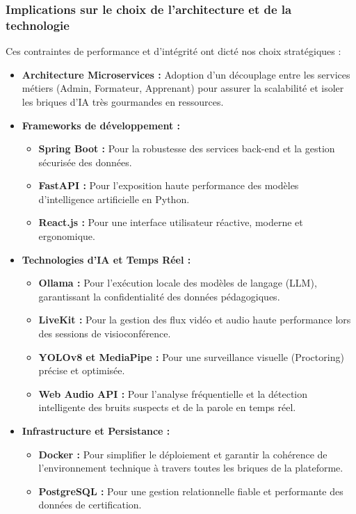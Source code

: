 \subsubsection{Implications sur le choix de l’architecture et de la technologie}
Ces contraintes de performance et d'intégrité ont dicté nos choix stratégiques :
\begin{itemize}
    \item \textbf{Architecture Microservices :} Adoption d'un découplage entre les services métiers (Admin, Formateur, Apprenant) pour assurer la scalabilité et isoler les briques d'IA très gourmandes en ressources.
    \item \textbf{Frameworks de développement :} 
    \begin{itemize}
        \item \textbf{Spring Boot :} Pour la robustesse des services back-end et la gestion sécurisée des données.
        \item \textbf{FastAPI :} Pour l'exposition haute performance des modèles d'intelligence artificielle en Python.
        \item \textbf{React.js :} Pour une interface utilisateur réactive, moderne et ergonomique.
    \end{itemize}
    \item \textbf{Technologies d'IA et Temps Réel :}
    \begin{itemize}
        \item \textbf{Ollama :} Pour l'exécution locale des modèles de langage (LLM), garantissant la confidentialité des données pédagogiques.
        \item \textbf{LiveKit :} Pour la gestion des flux vidéo et audio haute performance lors des sessions de visioconférence.
        \item \textbf{YOLOv8 et MediaPipe :} Pour une surveillance visuelle (Proctoring) précise et optimisée.
        \item \textbf{Web Audio API :} Pour l'analyse fréquentielle et la détection intelligente des bruits suspects et de la parole en temps réel.
    \end{itemize}
    \item \textbf{Infrastructure et Persistance :}
    \begin{itemize}
        \item \textbf{Docker :} Pour simplifier le déploiement et garantir la cohérence de l'environnement technique à travers toutes les briques de la plateforme.
        \item \textbf{PostgreSQL :} Pour une gestion relationnelle fiable et performante des données de certification.
    \end{itemize}
\end{itemize}

